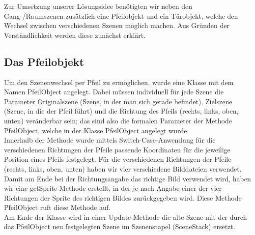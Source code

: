 Zur Umsetzung unserer Lösungsidee benötigten wir neben den Gang-/Raumszenen zusätzlich eine Pfeilobjekt und ein Türobjekt, welche den Wechsel zwischen verschiedenen Szenen möglich machen. Aus Gründen der Verständlichkeit werden diese zunächst erklärt.

\subsection{Das Pfeilobjekt}
Um den Szenenwechsel per Pfeil zu ermöglichen, wurde eine Klasse mit dem Namen PfeilObject angelegt. Dabei müssen individuell für jede Szene die Parameter Originalszene (Szene, in der man sich gerade befindet), Zielszene (Szene, in die der Pfeil führt) und die Richtung des Pfeils (rechts, links, oben, unten) veränderbar sein; das sind also die formalen Parameter der Methode PfeilObject, welche in der Klasse PfeilObject angelegt wurde. \\
Innerhalb der Methode wurde mittels Switch-Case-Anwendung für die verschiedenen Richtungen der Pfeile passende Koordinaten für die jeweilige Position eines Pfeils festgelegt. Für die verschiedenen Richtungen der Pfeile (rechts, links, oben, unten) haben wir vier verschiedene Bilddateien verwendet. \\
Damit am Ende bei der Richtungsangabe das richtige Bild verwendet wird, haben wir eine getSprite-Methode erstellt, in der je nach Angabe einer der vier Richtungen der Sprite des richtigen Bildes zurückgegeben wird. Diese Methode PfeilObject ruft diese Methode auf. \\
Am Ende der Klasse wird in einer Update-Methode die alte Szene mit der durch das PfeilObject neu festgelegten Szene im Szenenstapel (SceneStack) ersetzt.


